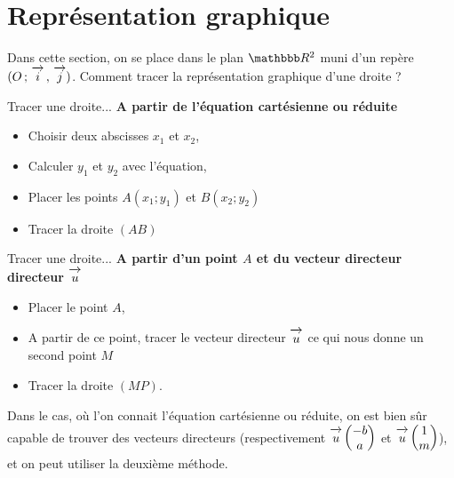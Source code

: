 \documentclass[10pt,a4paper,openany,twoside, prof]{book}
\begin{document}



\vspace{-5mm}
\section{Représentation graphique}

Dans cette section, on se place dans le plan $\R^2$ muni d'un repère $(O\,;\,\overrightarrow{\,\mathstrut i\,}\,,\,\overrightarrow{\,\mathstrut j\,})$.
Comment tracer la représentation graphique d'une droite ?

\noindent \begin{minipage}{8cm}
\begin{methode}{Tracer une droite...}{}
   \textbf{A partir de l'équation cartésienne ou réduite}
\medskip
\begin{itemize}
\item Choisir deux abscisses $x_{1}$ et $x_{2}$,\medskip
\item Calculer $y_{1}$ et $y_{2}$ avec l'équation,\medskip
\item Placer les points $A(x_1;y_1 )$ et $B(x_2;y_2)$ \medskip
\item Tracer la droite $(AB)$
\end{itemize}
\end{methode}
\end{minipage}
\hspace{5mm}
\noindent \begin{minipage}{8cm}
   \begin{methode}{Tracer une droite...}{}
      \textbf{A partir d'un point $A$ et du vecteur directeur directeur $\overrightarrow{\,\mathstrut u\,}$}
      \medskip
      \begin{itemize}
      \item Placer le point $A$,\medskip
      \item A partir de ce point, tracer le vecteur directeur $\overrightarrow{\,\mathstrut u\,}$ ce qui nous donne un second point $M$\medskip
      \item Tracer la droite $(MP)$.
      \end{itemize}
      \end{methode}
\end{minipage}

\begin{rem}{}{}
   Dans le cas, où l'on connait l'équation cartésienne ou réduite, on est bien sûr capable de trouver des vecteurs directeurs (respectivement $\overrightarrow{\,\mathstrut u\,}\begin{pmatrix}-b\\a\end{pmatrix}$ et $\overrightarrow{\,\mathstrut u\,}\begin{pmatrix}1\\m\end{pmatrix}$), et on peut utiliser la deuxième méthode.
\end{rem}
\end{document}
